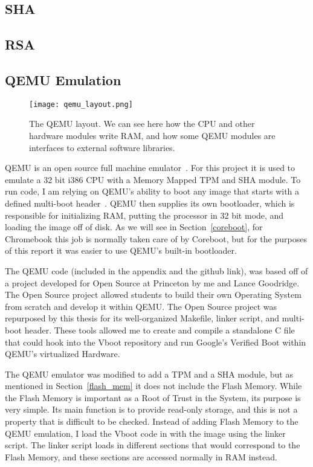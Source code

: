 \documentclass[../report.tex]{subfiles}
\begin{document}
\subsection{SHA}
\subsection{RSA}

\subsection{QEMU Emulation}\label{qemu_em}

\begin{figure}
  \centering
  \texttt{[image: qemu\_layout.png]}
  \caption{The QEMU layout. We can see here how the CPU and other hardware modules write RAM, and how some QEMU modules are interfaces to external software libraries.}
  \label{fig:qemu_layout}
\end{figure}

QEMU is an open source full machine emulator~\cite{qemu-site}.
For this project it is used to emulate a 32 bit i386 CPU with a Memory Mapped TPM and SHA module.
To run code, I am relying on QEMU's ability to boot any image that starts with a defined multi-boot header~\cite{multiboot}.
QEMU then supplies its own bootloader, which is responsible for initializing RAM, putting the processor in 32 bit mode, and loading the image off of disk.
As we will see in Section~\ref{coreboot}, for Chromebook this job is normally taken care of by Coreboot, but for the purposes of this report it was easier to use QEMU's built-in bootloader.

The QEMU code (included in the appendix and the github link), was based off of a project developed for Open Source at Princeton by me and Lance Goodridge.
The Open Source project allowed students to build their own Operating System from scratch and develop it within QEMU\@.
The Open Source project was repurposed by this thesis for its well-organized Makefile, linker script, and multi-boot header.
These tools allowed me to create and compile a standalone C file that could hook into the Vboot repository and run Google's Verified Boot within QEMU's virtualized Hardware.

The QEMU emulator was modified to add a TPM and a SHA module, but as mentioned in Section~\ref{flash_mem} it does not include the Flash Memory.
While the Flash Memory is important as a Root of Trust in the System, its purpose is very simple.
Its main function is to provide read-only storage, and this is not a property that is difficult to be checked.
Instead of adding Flash Memory to the QEMU emulation, I load the Vboot code in with the image using the linker script. %
The linker script loads in different sections that would correspond to the Flash Memory, and these sections are accessed normally in RAM instead.


\end{document}
